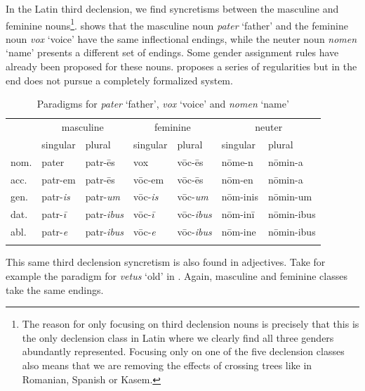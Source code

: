 
In the Latin third declension, we find syncretisms between the masculine and feminine nouns\footnote{The reason for only focusing on third declension nouns is precisely that this is the only declension class in Latin where we clearly find all three genders abundantly represented. Focusing only on one of the five declension classes also means that we are removing the effects of crossing trees like in Romanian, Spanish or Kasem.}.  shows that the masculine noun \textit{pater} `father' and the feminine noun \textit{vox} `voice' have the same inflectional endings, while the neuter noun \textit{nomen} `name' presents a different set of endings. Some gender assignment rules have already been proposed for these nouns. \textcite{Aronoff.1994} proposes a series of regularities but in the end does not pursue a completely formalized system.

\begin{table}
  \centering
  \begin{tabular}{lllllll}
    \lsptoprule
    & \multicolumn{2}{c}{masculine} & \multicolumn{2}{c}{feminine} & \multicolumn{2}{c}{neuter} \\

         & singular & plural    & singular & plural   & singular & plural     \\
    \midrule
    nom. & pater    & patr-ēs   & vox      & vōc-ēs   & nōme-n    & nōmin-a     \\
    acc. & patr-em  & patr-ēs   & vōc-em   & vōc-ēs   & nōm-en   & nōmin-a    \\
    gen. & patr-\textit{is}  & patr-\textit{um}   & vōc-\textit{is}   & vōc-\textit{um}   & nōm-inis & nōmin-um   \\
    dat. & patr-\textit{ī}   & patr-\textit{ibus} & vōc-\textit{ī}    & vōc-\textit{ibus} & nōm-inī  & nōmin-ibus \\
    abl. & patr-\textit{e}   & patr-\textit{ibus} & vōc-\textit{e}    & vōc-\textit{ibus} & nōm-ine  & nōmin-ibus \\
    \lspbottomrule
  \end{tabular}\caption{Paradigms for \textit{pater} `father', \textit{vox} `voice' and \textit{nomen} `name'}\label{tab:paradigm-third-nouns-lat}
\end{table}

This same third declension syncretism is also found in adjectives. Take for example the paradigm for \textit{vetus} `old' in . Again, masculine and feminine classes take the same endings.

